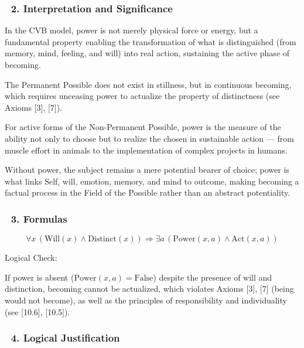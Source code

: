 \documentclass[12pt]{article}
\begin{document}
\subsubsection*{🔹 2. Interpretation and Significance}

In the CVB model, power is not merely physical force or energy, but a fundamental property enabling the transformation of what is distinguished (from memory, mind, feeling, and will) into real action, sustaining the active phase of becoming.

The Permanent Possible does not exist in stillness, but in continuous becoming, which requires unceasing power to actualize the property of distinctness (see Axioms [3], [7]).

For active forms of the Non-Permanent Possible, power is the measure of the ability not only to choose but to realize the chosen in sustainable action — from muscle effort in animals to the implementation of complex projects in humans.

Without power, the subject remains a mere potential bearer of choice; power is what links Self, will, emotion, memory, and mind to outcome, making becoming a factual process in the Field of the Possible rather than an abstract potentiality.

\subsubsection*{🔹 3. Formulas}

\[
\forall x\, (\text{Will}(x) \land \text{Distinct}(x)) \Rightarrow \exists a\, (\text{Power}(x, a) \land \text{Act}(x, a))
\]

Logical Check:

If power is absent ($\text{Power}(x, a) = \text{False}$) despite the presence of will and distinction, becoming cannot be actualized, which violates Axioms [3], [7] (being would not become), as well as the principles of responsibility and individuality (see [10.6], [10.5]).

\subsubsection*{🔹 4. Logical Justification}
\end{document}
